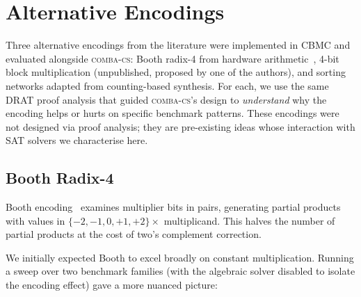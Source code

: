 \documentclass[a4paper]{ceurart}
\newcommand{\combacs}{\textsc{comba-cs}\xspace}
\newcommand{\cbmc}{\textsc{CBMC}\xspace}
\begin{document}
\section{Alternative Encodings}
\label{sec:alternative}

Three alternative encodings from the literature were implemented in
\cbmc and evaluated alongside \combacs: Booth radix-4 from hardware
arithmetic~\cite{booth1951signed}, 4-bit block multiplication
(unpublished, proposed by one of the authors), and sorting
networks adapted from counting-based synthesis. For each, we use
the same DRAT proof analysis that guided \combacs's design to
\emph{understand} why the encoding helps or hurts on specific
benchmark patterns. These encodings were not designed via proof
analysis; they are pre-existing ideas whose interaction with SAT
solvers we characterise here.

\subsection{Booth Radix-4}

Booth encoding~\cite{booth1951signed} examines multiplier bits in
pairs, generating partial products with values in
$\{-2, -1, 0, +1, +2\} \times$ multiplicand. This halves the number
of partial products at the cost of two's complement correction.

We initially expected Booth to excel broadly on constant
multiplication. Running a sweep over two benchmark families
(with the algebraic solver disabled to isolate the encoding
effect) gave a more nuanced picture:
\end{document}
